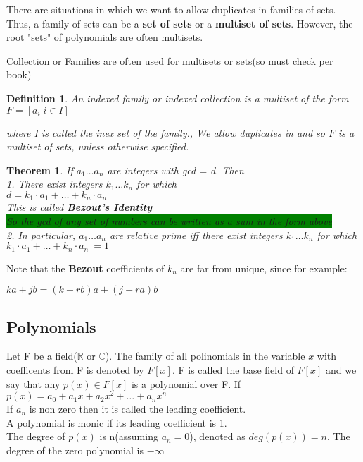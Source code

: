 \documentclass [12pt]{article}
\newtheorem {theorem}{Theorem}
\newtheorem {definition}{Definition}
\begin{document}
There are situations in which we want to allow duplicates in families of
sets. Thus, a family of sets can be a \textbf{set of sets} or a \textbf{multiset
of sets}. However, the root "sets" of polynomials are often multisets. 

Collection or Families are often used for multisets or sets(so must check
per book) 

\begin {definition}
 An indexed family or indexed collection is a multiset of the form \(F=[a_i|i\in I]\)

where I is called the inex set of the family., We allow duplicates in and
so $F$ is a multiset of sets, unless otherwise specified. 
\end {definition}
 

\begin {theorem}
 If \(a_1\ldots a_n\) are integers with gcd = d. Then\\
1. There exist integers \(k_1\ldots k_n\) for which \\
\(d=k_1\cdot a_1+\ldots +k_n\cdot a_n\)\\
This is called \textbf{Bezout's Identity}\\
\colorbox {green}{So the gcd of any set of numbers can be written as a sum
in the form above}\\
2. In particular, \(a_1\ldots a_n\) are relative prime iff there exist integers
\(k_1\ldots k_n\) for which \(k_1\cdot a_1+\ldots +k_n\cdot a_n\ =1\) \\
\end {theorem}
 Note that the \textbf{Bezout} coefficients of $k_n$ are far from unique,
since for example: 

\(ka+jb=(k+rb)a+(j-ra)b\) 


\subsection {Polynomials} 

Let F be a field(${\mathbb{R}}$ or ${\mathbb{C}}$). The family of all polinomials
in the variable $x$ with coefficents from F is denoted by $F[x]$. F is called
the base field of $F[x]$ and we say that any $p(x)\in F[x]$ is a polynomial
over F. If \(p(x)=a_0+a_{1}x+a_{2}x^{2}+\ldots +a_{n}x^{n}\) \\
\indent If $a_n$ is non zero then it is called the leading coefficient.\\
\indent A polynomial is monic if its leading coefficient is 1. \\
\indent The degree of $p(x)$ is n(assuming $a_n=0$), denoted as $deg(p(x))=n$.
The degree of the zero polynomial is $-\infty $ 
\end{document}
